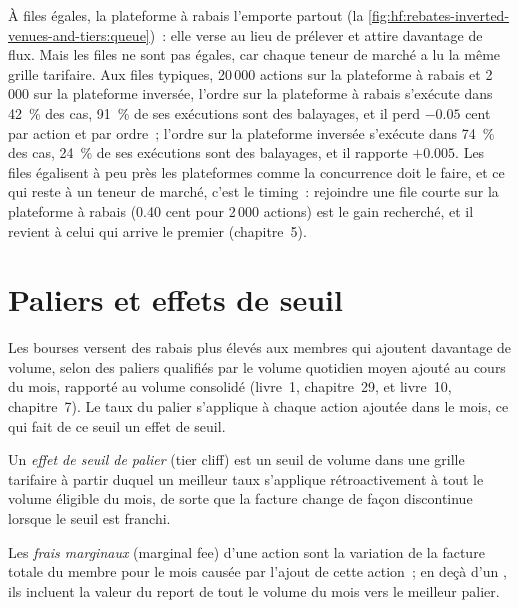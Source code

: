 À files égales, la plateforme à rabais l'emporte partout (la \cref{fig:hf:rebates-inverted-venues-and-tiers:queue})~: elle verse au lieu de prélever et attire
davantage de flux. Mais les files ne sont pas égales, car chaque teneur de marché a lu la même grille tarifaire. Aux files typiques, 20\,000 actions sur la plateforme à rabais
et 2\,000 sur la plateforme inversée, l'ordre sur la plateforme à rabais s'exécute dans 42~\% des cas, 91~\% de ses exécutions sont des balayages, et il perd $-0.05$ cent par action
et par ordre~; l'ordre sur la plateforme inversée s'exécute dans 74~\% des cas, 24~\% de ses exécutions sont des balayages, et il rapporte $+0.005$. Les files égalisent à peu près les plateformes
comme la concurrence doit le faire, et ce qui reste à un teneur de marché, c'est le timing~: rejoindre une file courte sur la plateforme à rabais (0.40 cent pour 2\,000
actions) est le gain recherché, et il revient à celui qui arrive le premier (chapitre~5).

\section{Paliers et effets de seuil}

Les bourses versent des rabais plus élevés aux membres qui ajoutent davantage de volume, selon des paliers qualifiés par le volume quotidien moyen ajouté au cours du mois, rapporté au
volume consolidé (livre~1, chapitre~29, et livre~10, chapitre~7). Le taux du palier s'applique à chaque action ajoutée dans le mois, ce qui fait de
ce seuil un effet de seuil.

\begin{definition}\label{def:hf:rebates-inverted-venues-and-tiers:cliff}
Un \emph{effet de seuil de palier} (tier cliff) est un seuil de volume dans une grille tarifaire à partir duquel un meilleur taux s'applique rétroactivement à tout le
volume éligible du mois, de sorte que la facture change de façon discontinue lorsque le seuil est franchi.
\end{definition}

\begin{definition}\label{def:hf:rebates-inverted-venues-and-tiers:marginal}
Les \emph{frais marginaux} (marginal fee) d'une action sont la variation de la facture totale du membre pour le mois causée par l'ajout de cette action~; en deçà d'un
, ils incluent la valeur du report de tout le volume du mois vers le meilleur palier.
\end{definition}

